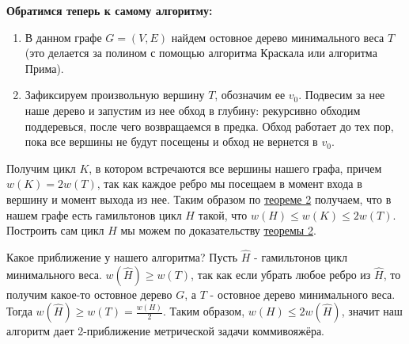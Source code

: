 \documentclass[14pt]{article}
\begin{document}
	\begin{center}
		\textbf{\large Обратимся теперь к самому алгоритму:}
	\end{center}

	\begin{enumerate}
		\item В данном графе $G=(V,E)$ найдем остовное дерево минимального веса $T$ (это делается за полином с помощью алгоритма Краскала или алгоритма Прима).
		\item Зафиксируем произвольную вершину $T$, обозначим ее $v_0$. Подвесим за нее наше дерево и запустим из нее обход в глубину: рекурсивно обходим поддеревься, после чего возвращаемся в предка. Обход работает до тех пор, пока все вершины не будут посещены и обход не вернется в $v_0$.
	\end{enumerate}
	
	Получим цикл $K$, в котором встречаются все вершины нашего графа, причем $w(K) = 2w(T)$, так как каждое ребро мы посещаем в момент входа в вершину и момент выхода из нее. Таким образом по \hyperref[Th2]{теореме 2} получаем, что в нашем графе есть гамильтонов цикл $H$ такой, что $w(H) \leq w(K) \leq 2w(T)$. Построить сам цикл $H$ мы можем по доказательству \hyperref[Th2]{теоремы 2}.
	
	Какое приближение у нашего алгоритма? Пусть $\hat{H}$ - гамильтонов цикл минимального веса. $w(\hat{H}) \geq w(T)$, так как если убрать любое ребро из $\hat{H}$, то получим какое-то остовное дерево $G$, а $T$ - остовное дерево минимального веса. Тогда $w(\hat{H}) \geq w(T) = \frac{w(H)}{2}$. Таким образом, $w(H) \leq 2w(\hat{H})$, значит наш алгоритм дает 2-приближение метрической задачи коммивояжёра.
	
\end{document}
